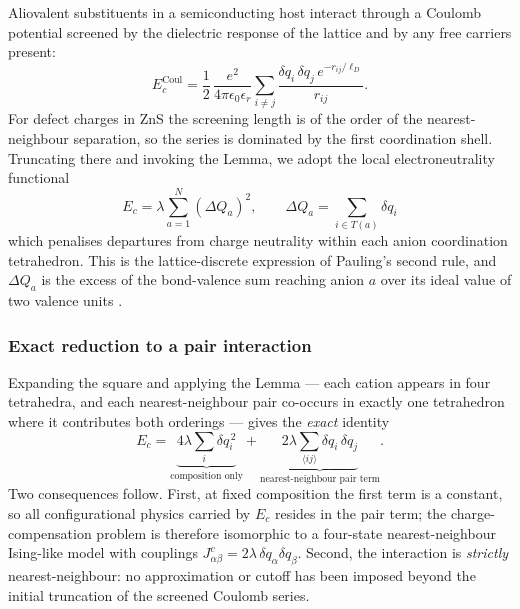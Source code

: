 \documentclass[11pt,a4paper]{article}
\newcommand{\dQ}{\Delta Q}
\begin{document}
Aliovalent substituents in a semiconducting host interact through a Coulomb
potential screened by the dielectric response of the lattice and by any free
carriers present:
\begin{equation}
E_c^{\mathrm{Coul}} = \frac{1}{2}\,\frac{e^2}{4\pi\epsilon_0\epsilon_r}
\sum_{i \neq j} \frac{\delta q_i\, \delta q_j\, e^{-r_{ij}/\ell_D}}{r_{ij}} .
\end{equation}
For defect charges in ZnS the screening length is of the order of the
nearest-neighbour separation, so the series is dominated by the first
coordination shell. Truncating there and invoking the Lemma, we adopt the local
electroneutrality functional
\begin{equation}
\boxed{\;E_c = \lambda \sum_{a=1}^{N} \left( \dQ_a \right)^2 ,
\qquad \dQ_a = \sum_{i \in T(a)} \delta q_i \;}
\label{eq:Ec}
\end{equation}
which penalises departures from charge neutrality within each anion coordination
tetrahedron. This is the lattice-discrete expression of Pauling's second rule,
and $\dQ_a$ is the excess of the bond-valence sum reaching anion $a$ over its
ideal value of two valence units \citep{pauling1929}.

\subsubsection{Exact reduction to a pair interaction}

Expanding the square and applying the Lemma --- each cation appears in four
tetrahedra, and each nearest-neighbour pair co-occurs in exactly one tetrahedron
where it contributes both orderings --- gives the \emph{exact} identity
\begin{equation}
E_c = \underbrace{4\lambda \sum_i \delta q_i^{\,2}}_{\text{composition only}}
 + \underbrace{2\lambda \sum_{\langle ij \rangle} \delta q_i\, \delta q_j}_{\text{nearest-neighbour pair term}} .
\label{eq:Ecpair}
\end{equation}
Two consequences follow. First, at fixed composition the first term is a
constant, so all configurational physics carried by $E_c$ resides in the pair
term; the charge-compensation problem is therefore isomorphic to a four-state
nearest-neighbour Ising-like model with couplings
$J^{c}_{\alpha\beta} = 2\lambda\, \delta q_\alpha \delta q_\beta$. Second, the
interaction is \emph{strictly} nearest-neighbour: no approximation or cutoff has
been imposed beyond the initial truncation of the screened Coulomb series.
\end{document}
